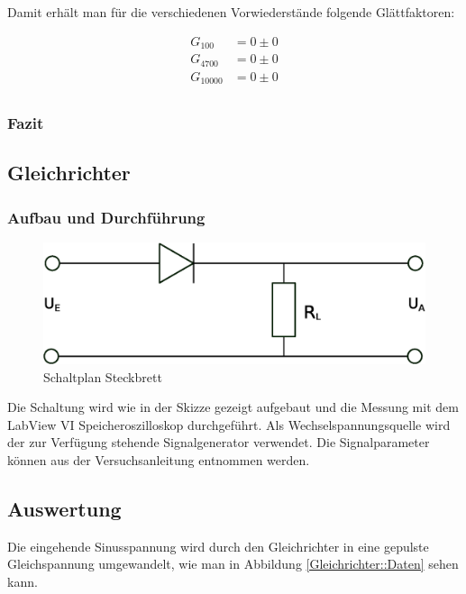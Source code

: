 \documentclass[12pt,twoside,a4paper]{scrartcl}
\begin{document}
				Damit erhält man für die verschiedenen Vorwiederstände folgende Glättfaktoren:

				\begin{align*}
					G_{100} &= 0 \pm 0 \\
					G_{4700} &= 0 \pm 0 \\
					G_{10000} &= 0 \pm 0 \\
				\end{align*}

			\subsubsection{Fazit}

	\subsection{Gleichrichter}

		\subsubsection{Aufbau und Durchführung}

		\begin{figure}[H]
			\centering

			\includegraphics[width = 0.8 \textwidth]{Pictures/rectifier}

			\caption{Schaltplan Steckbrett}
		\end{figure}

			Die Schaltung wird wie in der Skizze gezeigt aufgebaut und die Messung mit dem LabView VI Speicheroszilloskop durchgeführt. Als Wechselspannungsquelle wird der zur Verfügung stehende Signalgenerator verwendet. Die Signalparameter können aus der Versuchsanleitung entnommen werden.

		\subsection{Auswertung}

			Die eingehende Sinusspannung wird durch den Gleichrichter in eine gepulste Gleichspannung umgewandelt, wie man in Abbildung \ref{Gleichrichter::Daten} sehen kann.
\end{document}
